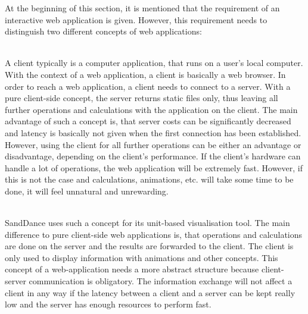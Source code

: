 At the beginning of this section, it is mentioned that the requirement of an interactive web application is given. However, this requirement needs to distinguish two different concepts of web applications:
\begin{enumerate}

 \hfill \\
A client typically is a computer application, that runs on a user's local computer. With the context of a web application, a client is basically a web browser. In order to reach a web application, a client needs to connect to a server. With a pure client-side concept, the server returns static files only, thus leaving all further operations and calculations with the application on the client. The main advantage of such a concept is, that server costs can be significantly decreased and latency is basically not given when the first connection has been established. However, using the client for all further operations can be either an advantage or disadvantage, depending on the client's performance. If the client's hardware can handle a lot of operations, the web application will be extremely fast. However, if this is not the case and calculations, animations, etc. will take some time to be done, it will feel unnatural and unrewarding.

 \hfill \\
SandDance uses such a concept for its unit-based visualisation tool. The main difference to pure client-side web applications is, that operations and calculations are done on the server and the results are forwarded to the client. The client is only used to display information with animations and other concepts. This concept of a web-application needs a more abstract structure because client-server communication is obligatory. The information exchange will not affect a client in any way if the latency between a client and a server can be kept really low and the server has enough resources to perform fast.
\end{enumerate}
